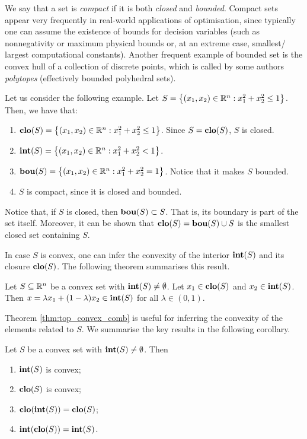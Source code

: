 We say that a set is \emph{compact} if it is both \emph{closed} and \emph{bounded}. Compact sets appear very frequently in real-world applications of optimisation, since typically one can assume the existence of bounds for decision variables (such as nonnegativity or maximum physical bounds or, at an extreme case, smallest/ largest computational constants). Another frequent example of bounded set is the convex hull of a collection of discrete points, which is called by some authors \emph{polytopes} (effectively bounded polyhedral sets).  

Let us consider the following example. Let $S = \left\{ (x_1,x_2) \in \mathbb{R}^n : x_1^2 + x_2^2 \leq 1 \right \}$. Then, we have that:
\begin{enumerate}
\item $\mathop{\bf clo}(S) = \left\{ (x_1,x_2) \in \mathbb{R}^n : x_1^2 + x_2^2 \leq 1 \right \}$. Since $S = \mathop{\bf clo}(S)$, $S$ is closed.
\item $\mathop{\bf int}(S) = \left\{ (x_1,x_2) \in \mathbb{R}^n : x_1^2 + x_2^2 < 1 \right \}$. 
\item $\mathop{\bf bou}(S) = \left\{ (x_1,x_2) \in \mathbb{R}^n : x_1^2 + x_2^2 = 1 \right \}$. Notice that it makes $S$ bounded.
\item $S$ is compact, since it is closed and bounded. 
\end{enumerate}

Notice that, if $S$ is closed, then $\mathop{\bf bou}(S) \subset S$. That is, its boundary is part of the set itself. Moreover, it can be shown that $\mathop{\bf clo}(S) = \mathop{\bf bou}(S) \cup S$ is the smallest closed set containing $S$. 

In case $S$ is convex, one can infer the convexity of the interior $\mathop{\bf int}(S)$ and its closure $\mathop{\bf clo}(S)$. The following theorem summarises this result.
%
\begin{theorem}\label{thm:top_convex_comb}
Let $S \subseteq \mathbb{R}^n$ be a convex set with $\mathop{\bf int}(S) \neq \emptyset$. Let $x_1 \in \mathop{\bf clo}(S)$ and $x_2 \in \mathop{\bf int}(S)$. Then $x = \lambda x_1 + (1 - \lambda) x_2 \in \mathop{\bf int}(S)$ for all $\lambda \in (0,1)$.
\end{theorem}
%


Theorem \ref{thm:top_convex_comb} is useful for inferring the convexity of the elements related to $S$. We summarise the key results in the following corollary.
%
\begin{corollary} Let $S$ be a convex set with $\mathop{\bf int}(S) \neq \emptyset$. Then
	\begin{enumerate}
		\item $\mathop{\bf int}(S)$ is convex;
		\item $\mathop{\bf clo}(S)$ is convex;
		\item $\mathop{\bf clo}(\mathop{\bf int}(S)) = \mathop{\bf clo}(S)$;
		\item $\mathop{\bf int}(\mathop{\bf clo}(S)) = \mathop{\bf int}(S)$.
	\end{enumerate}
\end{corollary}
%


